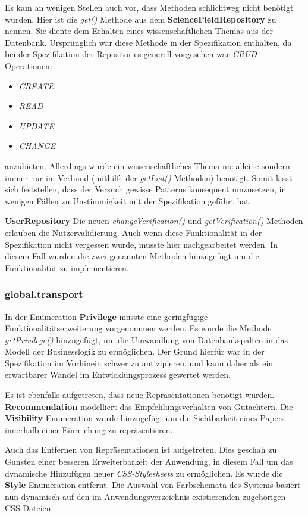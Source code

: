 Es kam an wenigen Stellen auch vor, dass Methoden schlichtweg nicht benötigt wurden.
Hier ist die \emph{get()} Methode aus dem \textbf{ScienceFieldRepository} zu nennen.
Sie diente dem Erhalten eines wissenschaftlichen Themas aus der Datenbank.
Ursprünglich war diese Methode in der Spezifikation enthalten, da
bei der Spezifikation der Repositories generell
vorgesehen war \emph{CRUD}-Operationen:
\begin{itemize}
    \item \emph{CREATE}
    \item \emph{READ}
    \item \emph{UPDATE}
    \item \emph{CHANGE}
\end{itemize}
anzubieten.
Allerdings wurde ein wissenschaftliches Thema nie alleine sondern immer nur im Verbund
(mithilfe der \emph{getList()}-Methoden) benötigt.
Somit lässt sich feststellen, dass der Versuch gewisse Patterns konsequent umzusetzen,
in wenigen Fällen zu Unstimmigkeit mit der Spezifikation geführt hat.

\textbf{UserRepository} Die neuen \emph{changeVerification()} und \emph{getVerification()}
Methoden erlauben die Nutzervalidierung. Auch wenn diese Funktionalität in der Spezifikation nicht
vergessen wurde, musste hier nachgearbeitet werden.
In diesem Fall wurden die zwei genannten Methoden hinzugefügt um die Funktionalität zu implementieren.

\subsubsection{global.transport}

In der  Enumeration \textbf{Privilege} musste eine geringfügige Funktionalitätserweiterung vorgenommen werden.
Es wurde die Methode \emph{getPrivilege()} hinzugefügt,
um die Umwandlung von Datenbankspalten in das Modell der Businesslogik zu ermöglichen.
Der Grund hierfür war in der Spezifikation im Vorhinein schwer zu antizipieren,
und kann daher als ein erwartbarer Wandel im Entwicklungsprozess gewertet werden.

Es ist ebenfalls aufgetreten, dass neue Repräsentationen benötigt wurden.
\textbf{Recommendation} modelliert
das Empfehlungsverhalten von Gutachtern.
Die \textbf{Visibility}-Enumeration wurde hinzugefügt um die Sichtbarkeit eines
Papers innerhalb einer Einreichung zu repräsentieren.

Auch das Entfernen von Repräsentationen ist aufgetreten.
Dies geschah zu Gunsten einer besseren Erweiterbarkeit der Anwendung, in diesem Fall um das dynamische Hinzufügen
neuer \emph{CSS-Stylesheets} zu ermöglichen.
Es wurde die \textbf{Style} Enumeration entfernt. Die Auswahl von Farbschemata des
Systems basiert nun dynamisch auf den im Anwendungsverzeichnis existierenden zugehörigen
CSS-Dateien.


